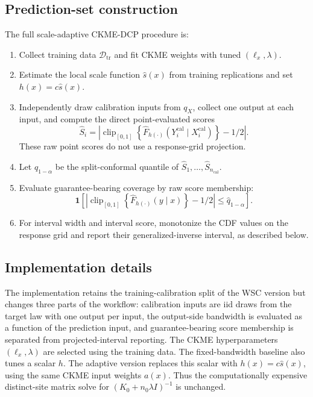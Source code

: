 \documentclass[11pt]{article}
\newcommand{\Dcal}{\mathcal D}
\newcommand{\ind}{\mathbf 1}
\newcommand{\abs}[1]{\left\lvert #1 \right\rvert}
\begin{document}
\subsection{Prediction-set construction}

The full scale-adaptive CKME-DCP procedure is:
\begin{enumerate}[leftmargin=1.7em]
  \item Collect training data \(\Dcal_{\mathrm{tr}}\) and fit CKME weights with tuned \((\ell_x,\lambda)\).
  \item Estimate the local scale function \(\widehat s(x)\) from training replications and set \(h(x)=c\widehat s(x)\).
  \item Independently draw calibration inputs from \(q_X\), collect one output at each input, and compute the direct point-evaluated scores
  \[
    \widehat S_i
    =
    \abs{
    \operatorname{clip}_{[0,1]}
    \!\left\{\widehat F_{h(\cdot)}
    (Y_i^{\mathrm{cal}}\mid X_i^{\mathrm{cal}})\right\}
    -1/2}.
  \]
  These raw point scores do not use a response-grid projection.
  \item Let \(\widehat q_{1-\alpha}\) be the split-conformal quantile of \(\widehat S_1,\ldots,\widehat S_{n_{\mathrm{cal}}}\).
  \item Evaluate guarantee-bearing coverage by raw score membership:
  \[
    \ind\!\left[
    \abs{
    \operatorname{clip}_{[0,1]}
    \!\left\{\widehat F_{h(\cdot)}(y\mid x)\right\}
    -1/2}
    \le \widehat q_{1-\alpha}
    \right].
  \]
  \item For interval width and interval score, monotonize the CDF values on the response grid and report their generalized-inverse interval, as described below.
\end{enumerate}

\subsection{Implementation details}
\label{sec:implementation}

The implementation retains the training-calibration split of the WSC version but changes three parts of the workflow: calibration inputs are iid draws from the target law with one output per input, the output-side bandwidth is evaluated as a function of the prediction input, and guarantee-bearing score membership is separated from projected-interval reporting. The CKME hyperparameters \((\ell_x,\lambda)\) are selected using the training data. The fixed-bandwidth baseline also tunes a scalar \(h\). The adaptive version replaces this scalar with \(h(x)=c\widehat s(x)\), using the same CKME input weights \(a(x)\). Thus the computationally expensive distinct-site matrix solve for \((K_0+n_0\lambda I)^{-1}\) is unchanged.
\end{document}
